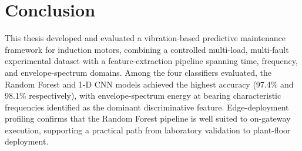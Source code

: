 \section{Conclusion}
This thesis developed and evaluated a vibration-based predictive maintenance framework for
induction motors, combining a controlled multi-load, multi-fault experimental dataset with a
feature-extraction pipeline spanning time, frequency, and envelope-spectrum domains. Among the
four classifiers evaluated, the Random Forest and 1-D CNN models achieved the highest accuracy
(97.4\% and 98.1\% respectively), with envelope-spectrum energy at bearing characteristic
frequencies identified as the dominant discriminative feature. Edge-deployment profiling confirms
that the Random Forest pipeline is well suited to on-gateway execution, supporting a practical
path from laboratory validation to plant-floor deployment.

